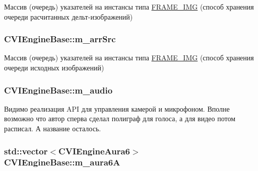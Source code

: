 Массив (очередь) указателей на инстансы типа \hyperlink{class_f_r_a_m_e___i_m_g}{F\+R\+A\+M\+E\+\_\+\+I\+M\+G} (способ хранения очереди расчитанных дельт-\/изображений) 

\hypertarget{class_c_v_i_engine_base_a9b14da4c2f0ccba53a81ab89b89b2a03}{
\subsubsection[{m\+\_\+arr\+Src}]{ C\+V\+I\+Engine\+Base\+::m\+\_\+arr\+Src}}\label{class_c_v_i_engine_base_a9b14da4c2f0ccba53a81ab89b89b2a03}


Массив (очередь) указателей на инстансы типа \hyperlink{class_f_r_a_m_e___i_m_g}{F\+R\+A\+M\+E\+\_\+\+I\+M\+G} (способ хранения очереди исходных изображений) 

\hypertarget{class_c_v_i_engine_base_af996670eec8597e3529bfd0a2ec2585e}{
\subsubsection[{m\+\_\+audio}]{ C\+V\+I\+Engine\+Base\+::m\+\_\+audio}}\label{class_c_v_i_engine_base_af996670eec8597e3529bfd0a2ec2585e}


Видимо реализация A\+P\+I для управления камерой и микрофоном. Вполне возможно что автор сперва сделал полиграф для голоса, а для видео потом расписал. А название осталось. 

\hypertarget{class_c_v_i_engine_base_aa4b9c935b9223f0efcc05282e871254d}{
\subsubsection[{m\+\_\+aura6\+A}]{\setlength{\rightskip}{0pt plus 5cm}std\+::vector$<$C\+V\+I\+Engine\+Aura6$>$ C\+V\+I\+Engine\+Base\+::m\+\_\+aura6\+A}}\label{class_c_v_i_engine_base_aa4b9c935b9223f0efcc05282e871254d}




